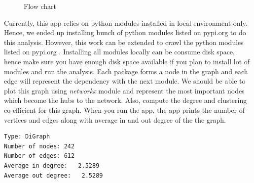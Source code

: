 \begin{figure}[htbp]
\centering
{}
\caption{Flow chart}
\label{fig:flowchart}
\end{figure}

Currently, this app relies on python modules installed in local environment only. 
Hence, we ended up installing bunch of python modules listed on pypi.org \cite{www-pypi}
to do this analysis. However, this work can be extended to crawl the python modules
listed on pypi.org \cite{www-pypi}. Installing all modules locally can be consume 
disk space, hence make sure you have enough disk space available if you plan to
install lot of modules and run the analysis. 
 Each package forms a node in the graph and each
 edge will represent the dependency with the next module. We should be able
 to plot this graph using \textit{networkx} module and represent the most important nodes
 which become the hubs to the network. Also, compute the degree and clustering 
 co-efficient for this graph. When you run the app, the app prints the number of vertices 
 and edges along with average in and out degree of the the graph.
 \begin{verbatim}
Type: DiGraph
Number of nodes: 242
Number of edges: 612
Average in degree:   2.5289
Average out degree:   2.5289
\end{verbatim}

